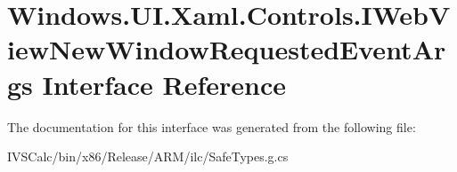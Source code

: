 \hypertarget{interface_windows_1_1_u_i_1_1_xaml_1_1_controls_1_1_i_web_view_new_window_requested_event_args}{}\section{Windows.\+U\+I.\+Xaml.\+Controls.\+I\+Web\+View\+New\+Window\+Requested\+Event\+Args Interface Reference}
\label{interface_windows_1_1_u_i_1_1_xaml_1_1_controls_1_1_i_web_view_new_window_requested_event_args}


The documentation for this interface was generated from the following file\+:\begin{DoxyCompactItemize}
\item 
I\+V\+S\+Calc/bin/x86/\+Release/\+A\+R\+M/ilc/Safe\+Types.\+g.\+cs\end{DoxyCompactItemize}
